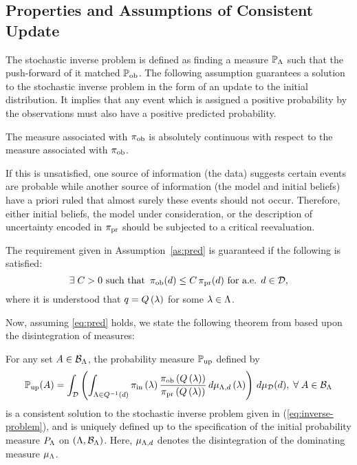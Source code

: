 \subsection{Properties and Assumptions of Consistent Update}\label{sec:properties}

The stochastic inverse problem is defined as finding a measure $\mathbb{P}_{\Lambda}$ such that the push-forward of it matched $\operatorname*{\mathbb{P}_{ob}}$.
The following assumption guarantees a solution to the stochastic inverse problem in the form of an update to the initial distribution.
It implies that any event which is assigned a positive probability by the observations must also have a positive predicted probability.

\begin{assumption}\label{as:pred}
  The measure associated with $\operatorname*{\pi_{ob}}$ is absolutely continuous with respect to the measure associated with $\operatorname*{\pi_{ob}}$.
\end{assumption}

If this is unsatisfied, one source of information (the data) suggests certain events are probable while another source of information (the model and initial beliefs) have a priori ruled that almost surely these events should not occur.
Therefore, either initial beliefs, the model under consideration, or the description of uncertainty encoded in $\operatorname*{\pi_{pr}}$ should be subjected to a critical reevaluation.


The requirement given in Assumption~\ref{as:pred} is guaranteed if the following is satisfied:
\begin{equation}\label{eq:pred}
  \exists \; C>0 \text{ such that } \operatorname*{\pi_{ob}} (d) \leq C \operatorname*{\pi_{pr}}(d) \text{ for a.e. } d\in \mathcal{D},
\end{equation}
where it is understood that $q = Q\left ( \lambda \right )$ for some $\lambda \in {\Lambda}$.


Now, assuming \eqref{eq:pred} holds, we state the following theorem from \cite{BJW18} based upon the disintegration of measures:


\begin{thm}
  For any set $A\in \mathcal{B}_{{\Lambda}}$, the probability measure $\operatorname*{\mathbb{P}_{up}}$ defined by
  \begin{equation}\label{eq:dci_sol}
    \operatorname*{\mathbb{P}_{up}} (A) = \int_{\mathcal{D}} \left (  \int_{{\Lambda} \in Q^{-1}(d)}  \operatorname*{\pi_{in}}\left ( \lambda \right ) \frac{\operatorname*{\pi_{ob}}\left ( Q\left ( \lambda \right ) \right )}{\operatorname*{\pi_{pr}}\left ( Q\left ( \lambda \right ) \right )} \, d\mu_{{\Lambda}, d} \left ( \lambda \right ) \right ) \, d\mu_{\mathcal{D}}(d), \; \forall \; A \in \mathcal{B}_{{\Lambda}}
  \end{equation}
  is a consistent solution to the stochastic inverse problem given in (\ref{eq:inverse-problem}), and is uniquely defined up to the specification of the initial probability measure $P_{\Lambda}$ on $({\Lambda}, \mathcal{B}_{{\Lambda}})$.
  Here, $\mu_{{\Lambda}, d}$ denotes the disintegration of the dominating measure $\mu_{\Lambda}$.
\end{thm}

